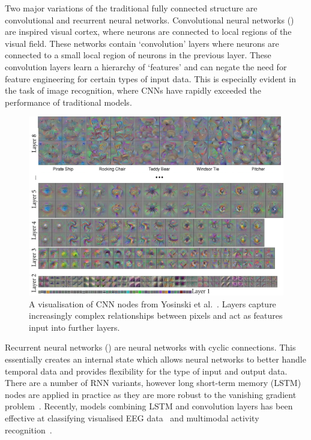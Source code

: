 \documentclass[12pt, twoside]{book}
\renewcommand\emph[1]{\textit{\color{USred}{#1}}}
\begin{document}
Two major variations of the traditional fully connected structure are convolutional and recurrent neural networks. Convolutional neural networks (\emph{CNNs}) are inspired visual cortex, where neurons are connected to local regions of the visual field. These networks contain `convolution' layers where neurons are connected to a small local region of neurons in the previous layer. These convolution layers learn a hierarchy of `features' and can negate the need for feature engineering for certain types of input data. This is especially evident in the task of image recognition, where CNNs have rapidly exceeded the performance of traditional models.


\begin{figure}[h]
	\label{cnnvis}
	\centering\includegraphics[width=1\linewidth]{cnnvis.png}
	\caption{A visualisation of CNN nodes from Yosinski et al.~\cite{cnnvis}. Layers capture increasingly complex relationships between pixels and act as features input into further layers. }
\end{figure}


Recurrent neural networks (\emph{RNNs}) are neural networks with cyclic connections. This essentially creates an internal state which allows neural networks to better handle temporal data and provides flexibility for the type of input and output data. There are a number of RNN variants, however long short-term memory (LSTM) nodes are applied in practice as they are more robust to the vanishing gradient problem~\cite{lstm}. Recently, models combining LSTM and convolution layers has been effective at classifying visualised EEG data~\cite{bashivan2015learning} and multimodal activity recognition~\cite{ordonez2016deep}.
\end{document}
